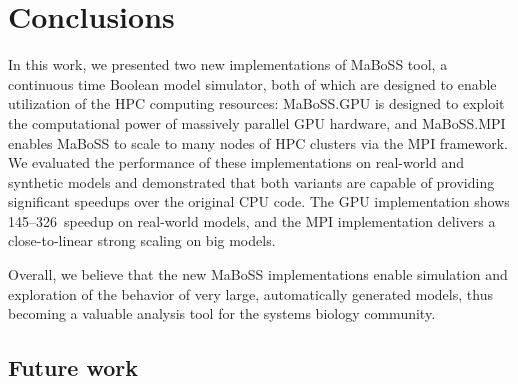 \documentclass[a4paper,num-refs]{oup-contemporary}
\begin{document}



\section{Conclusions}

In this work, we presented two new implementations of MaBoSS tool, a continuous time Boolean model simulator, both of which are designed to enable utilization of the HPC computing resources: MaBoSS.GPU is designed to exploit the computational power of massively parallel GPU hardware, and MaBoSS.MPI enables MaBoSS to scale to many nodes of HPC clusters via the MPI framework. We evaluated the performance of these implementations on real-world and synthetic models and demonstrated that both variants are capable of providing significant speedups over the original CPU code. The GPU implementation shows 145--326\texttimes\ speedup on real-world models, and the MPI implementation delivers a close-to-linear strong scaling on big models.

Overall, we believe that the new MaBoSS implementations enable simulation and exploration of the behavior of very large, automatically generated models, thus becoming a valuable analysis tool for the systems biology community.

\subsection{Future work} 
\end{document}
